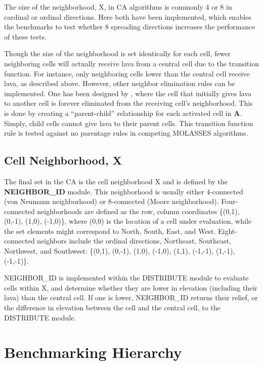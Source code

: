 \documentclass[12pt,letter]{article}
\begin{document}
		The size of the neighborhood, X, in CA algorithms is commonly 4 or 8 in cardinal or ordinal directions. Here both have been implemented, which enables the benchmarks to test whether 8 spreading directions increases the performance of these tests.

		Though the size of the neighborhood is set identically for each cell, fewer neighboring cells will actually receive lava from a central cell due to the transition function. For instance, only neighboring cells lower than the central cell receive lava, as described above. However, other neighbor elimination rules can be implemented. One has been designed by \citet{connor2012}, where the cell that initially gives lava to another cell is forever eliminated from the receiving cell's neighborhood. This is done by creating a ``parent-child'' relationship for each activated cell in \textbf{A}. Simply, child cells cannot give lava to their parent cells. This transition function rule is tested against no parentage rules in competing MOLASSES algorithms.
		
	\subsection{Cell Neighborhood, X}
		The final set in the CA is the cell neighborhood X and is defined by the \textbf{NEIGHBOR\_ID} module. This neighborhood is usually either 4-connected (von Neumann neighborhood) or 8-connected (Moore neighborhood). Four-connected neighborhoods are defined as the row, column coordinates \{(0,1), (0,-1), (1,0), (-1,0)\}, where (0,0) is the location of a cell under evaluation, while the set elements might correspond to North, South, East, and West. Eight-connected neighbors include the ordinal directions, Northeast, Southeast, Northwest, and Southwest: \{(0,1), (0,-1), (1,0), (-1,0), (1,1), (-1,-1), (1,-1), (-1,-1)\}.
		
		NEIGHBOR\_ID is implemented within the DISTRIBUTE module to evaluate cells within X, and determine whether they are lower in elevation (including their lava) than the central cell. If one is lower, NEIGHBOR\_ID returns their relief, or the difference in elevation between the cell and the central cell, to the DISTRIBUTE module.

			
			
			

	\section{Benchmarking Hierarchy}\label{sec:benchmark}
	
\end{document}
